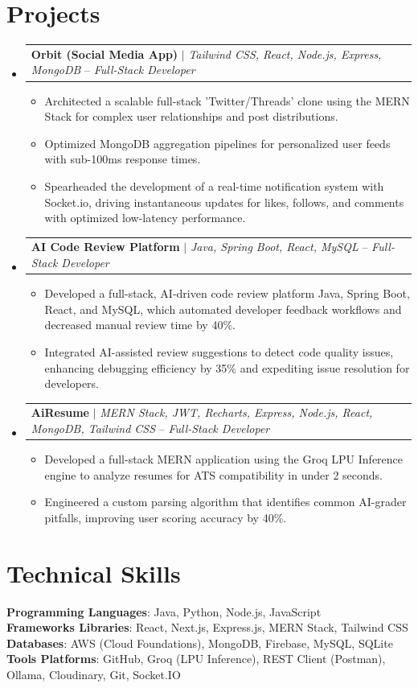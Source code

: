 \documentclass[letterpaper,11pt]{article}
\makeatletter
\newcommand{\resumeItem}[1]{
  \item\small{#1 \vspace{-2pt}}
}
\newcommand{\resumeProjectHeading}[2]{
    \item
    \begin{tabular*}{0.97\textwidth}{l@{\extracolsep{\fill}}r}
      \small#1 & #2 \\
    \end{tabular*}\vspace{-7pt}
}
\newcommand{\resumeSubHeadingListStart}{\begin{itemize}[leftmargin=0.15in, label={}]}
\newcommand{\resumeSubHeadingListEnd}{\end{itemize}}
\newcommand{\resumeItemListStart}{\begin{itemize}}
\newcommand{\resumeItemListEnd}{\end{itemize}\vspace{-5pt}}
\makeatother
\begin{document}
\section{Projects}
    \resumeSubHeadingListStart
    \resumeProjectHeading
        {\textbf{Orbit (Social Media App)} $|$ \emph{\small Tailwind CSS, React, Node.js, Express, MongoDB} -- \textit{\small Full-Stack Developer}}{}
      \resumeItemListStart
        \resumeItem{Architected a scalable full-stack 'Twitter/Threads' clone using the MERN Stack for complex user relationships and post distributions.}
        \resumeItem{Optimized MongoDB aggregation pipelines for personalized user feeds with sub-100ms response times.}
        \resumeItem{Spearheaded the development of a real-time notification system with Socket.io, driving instantaneous updates for likes, follows, and comments with optimized low-latency performance.}
      \resumeItemListEnd
    \resumeProjectHeading
        {\textbf{AI Code Review Platform} $|$ \emph{\small Java, Spring Boot, React, MySQL} -- \textit{\small Full-Stack Developer}}{}
      \resumeItemListStart
        \resumeItem{Developed a full-stack, AI-driven code review platform Java, Spring Boot, React, and MySQL, which automated developer feedback workflows and decreased manual review time by 40\%.}
        \resumeItem{Integrated AI-assisted review suggestions to detect code quality issues, enhancing debugging efficiency by 35\% and expediting issue resolution for developers.}
      \resumeItemListEnd
    \resumeProjectHeading
        {\textbf{AiResume} $|$ \emph{\small MERN Stack, JWT, Recharts, Express, Node.js, React, MongoDB, Tailwind CSS} -- \textit{\small Full-Stack Developer}}{}
      \resumeItemListStart
        \resumeItem{Developed a full-stack MERN application using the Groq LPU Inference engine to analyze resumes for ATS compatibility in under 2 seconds.}
        \resumeItem{Engineered a custom parsing algorithm that identifies common AI-grader pitfalls, improving user scoring accuracy by 40\%.}
      \resumeItemListEnd
    \resumeSubHeadingListEnd


\section{Technical Skills}
 \begin{itemize}[leftmargin=0.15in, label={}]
    \small{\item{
     \textbf{Programming Languages}{: Java, Python, Node.js, JavaScript} \\
     \textbf{Frameworks Libraries}{: React, Next.js, Express.js, MERN Stack, Tailwind CSS} \\
     \textbf{Databases}{: AWS (Cloud Foundations), MongoDB, Firebase, MySQL, SQLite} \\
     \textbf{Tools Platforms}{: GitHub, Groq (LPU Inference), REST Client (Postman), Ollama, Cloudinary, Git, Socket.IO} \\
    }}
 \end{itemize}
\end{document}
